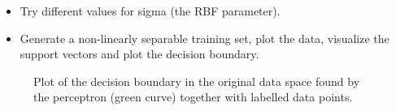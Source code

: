 \documentclass[a4]{article}
\begin{document}
\begin{itemize}
\item Try different values for sigma (the RBF parameter).
\end{itemize}

\begin{itemize}
\item Generate a non-linearly separable training set, plot the data, visualize the support vectors and plot the decision boundary.
\end{itemize}
\begin{figure}[!h]
	\begin{center}
		\centering
	\end{center}
	\caption{\label{fig:perceptron}Plot of the decision boundary in the original data space found by the perceptron (green curve) together with labelled data points.}
\end{figure}





% 
% 
\end{document}
